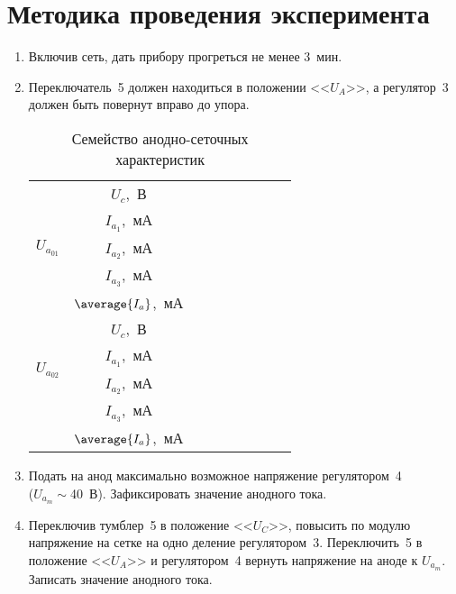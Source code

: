 \section{Методика проведения эксперимента}
\renewcommand{\labelenumi}{4.\arabic{enumi}.}
\begin{enumerate}
  \item Включив сеть, дать прибору прогреться не менее 3~мин.
  
  \item Переключатель~5 должен находиться в положении <<\( U_A \)>>, а
    регулятор~3 должен быть повернут вправо до упора.
    \begin{table}[b!]
      \center
      \caption{Семейство анодно-сеточных характеристик}
      \label{grid-anod}
      \begin{tabular}{|m{}|C{.1}|*{7}{C{.07}|}} \hline
         &
          \( U_c \),~В &&&&&&& \\ 
        & \( I_{a_1} \),~мА &&&&&&& \\ 
        & \( I_{a_2} \),~мА &&&&&&& \\ 
        & \( I_{a_3} \),~мА &&&&&&& \\ 
        & \( \average{I_a} \),~мА &&&&&&& \\ \hline
         &
          \( U_c \),~В &&&&&&& \\ 
         &
          \( I_{a_1} \),~мА &&&&&&& \\ 
        & \( I_{a_2} \),~мА &&&&&&& \\ 
        & \( I_{a_3} \),~мА &&&&&&& \\ 
        & \( \average{I_a} \),~мА &&&&&&& \\ \hline
      \end{tabular}
    \end{table}

  \item Подать на анод максимально возможное напряжение регулятором~4\\
    (\( U_{a_m} \sim \)40~В). Зафиксировать значение анодного тока.
    
  \item Переключив тумблер~5 в положение <<\( U_C \)>>, повысить по модулю
    напряжение на сетке на одно деление регулятором~3. Переключить~5 в положение
    <<\( U_A \)>> и регулятором~4 вернуть напряжение на аноде к \( U_{a_m} \).
    Записать значение анодного тока.
    

\end{enumerate}

